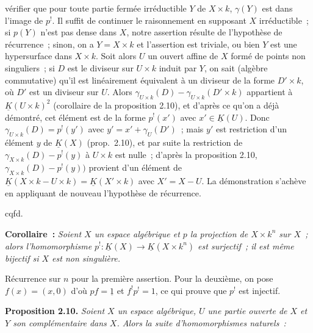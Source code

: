 vérifier que pour toute partie fermée irréductible $Y$ de $X\times k$, $\gamma(Y)$ est dans l'image de $p^!$. Il suffit de continuer le raisonnement en supposant $X$ irréductible~; si $p(Y)$ n'est pas dense dans $X$, notre assertion résulte de l'hypothèse de récurrence~; sinon, on a $Y=X\times k$ et l'assertion est triviale, ou bien $Y$ est une hypersurface dans $X\times k$. Soit alors $U$ un ouvert affine de $X$ formé de points non singuliers~; si $D$ est le diviseur sur $U\times k$ induit par $Y$, on sait (algèbre commutative) qu'il est linéairement équivalent à un diviseur de la forme $D'\times k$, où $D'$ est un diviseur sur $U$. Alors $\gamma_{U\times k}(D)-\gamma_{U\times k}(D'\times k)$ appartient à $\underline K(U\times k)^2$ (corollaire de la proposition 2.10), et d'après ce qu'on a déjà démontré, cet élément est de la forme $p^!(x')$ avec $x'\in\underline K(U)$. Donc $\gamma_{U\times k}(D)=p^!(y')$ avec $y'=x'+\gamma_U(D')$~; mais $y'$ est restriction d'un élément $y$ de $\underline K(X)$ (prop.\ 2.10), et par suite la restriction de $\gamma_{X\times k}(D)-p^!(y)$ à $U\times k$ est nulle~; d'après la proposition 2.10, $\gamma_{X\times k}(D)-p^!(y))$ provient d'un élément de $\underline K(X\times k-U\times k)=\underline K(X'\times k)$ avec $X'=X-U$. La démonstration s'achève en appliquant de nouveau l'hypothèse de récurrence.
\begin{flushright}cqfd.\end{flushright}

\textbf{Corollaire~:} \emph{Soient $X$ un espace algébrique et $p$ la projection de $X\times k^n$ sur $X$~; alors l'homomorphisme $p^!:\underline K(X)\longrightarrow\underline K(X\times k^n)$ est surjectif~; il est même bijectif si $X$ est non singulière.}

Récurrence sur $n$ pour la première assertion. Pour la deuxième, on pose $f(x)=(x,0)$ d'où $pf=\underline{1}$ et $f^!p^!=1$, ce qui prouve que $p^!$ est injectif.

\textbf{Proposition 2.10.} \emph{Soient $X$ un espace algébrique, $U$ une partie ouverte de $X$ et $Y$ son complémentaire dans $X$. Alors la suite d'homomorphismes naturels~:}
